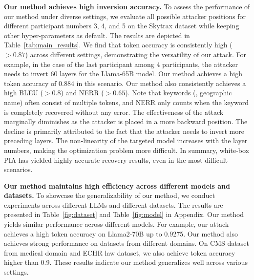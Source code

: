 \noindent
\textbf{Our method achieves high inversion accuracy. } 
To assess the performance of our method under diverse settings, we evaluate all possible attacker positions for different participant numbers 3, 4, and 5 on the Skytrax dataset while keeping other hyper-parameters as default. The results are depicted in Table~\ref{tab:main_results}. We find that token accuracy is consistently high ($>0.87$) across different settings, demonstrating the versatility of our attack. 
For example, in the case of the last participant among 4 participants, the attacker needs to invert 60 layers for the Llama-65B model. Our method achieves a high token accuracy of 0.884 in this scenario. Our method also consistently achieves a high BLEU ($>0.8$) and NERR ($>0.65$). Note that keywords (\eg, geographic name) often consist of multiple tokens, and NERR only counts when the keyword is completely recovered without any error. The effectiveness of the attack marginally diminishes as the attacker is placed in a more backward position. The decline is primarily attributed to the fact that the attacker needs to invert more preceding layers. The non-linearity of the targeted model increases with the layer numbers, making the optimization problem more difficult. In summary, white-box PIA has yielded highly accurate recovery results, even in the most difficult scenarios.


\noindent
\textbf{Our method maintains high efficiency across different models and datasets. }
To showcase the generalizability of our method, 
we conduct experiments across different LLMs and different datasets.
The results are presented in Table~\ref{fig:dataset} and Table~\ref{fig:model} in Appendix. Our method yields similar performance across different models. For example, our attack achieves a high token accuracy on Llama2-70B up to 0.9275. Our method also achieves strong performance on datasets from different domains. On CMS dataset from medical domain and ECHR law dataset, we also achieve token accuracy higher than 0.9. These results indicate our method generalizes well across various settings.


